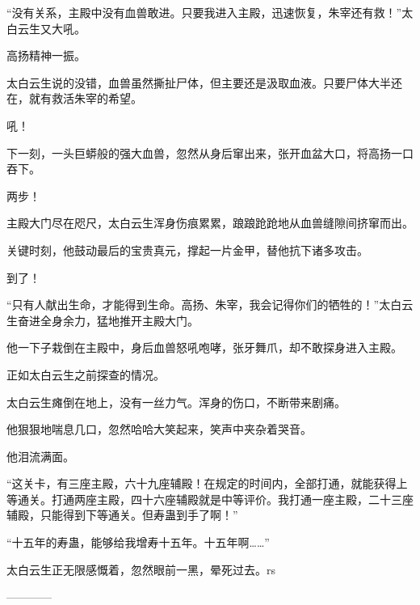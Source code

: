 \begin{this_body}
“没有关系，主殿中没有血兽敢进。只要我进入主殿，迅速恢复，朱宰还有救！”太白云生又大吼。

高扬精神一振。

太白云生说的没错，血兽虽然撕扯尸体，但主要还是汲取血液。只要尸体大半还在，就有救活朱宰的希望。

吼！

下一刻，一头巨蟒般的强大血兽，忽然从身后窜出来，张开血盆大口，将高扬一口吞下。

两步！

主殿大门尽在咫尺，太白云生浑身伤痕累累，踉踉跄跄地从血兽缝隙间挤窜而出。

关键时刻，他鼓动最后的宝贵真元，撑起一片金甲，替他抗下诸多攻击。

到了！

“只有人献出生命，才能得到生命。高扬、朱宰，我会记得你们的牺牲的！”太白云生奋进全身余力，猛地推开主殿大门。

他一下子栽倒在主殿中，身后血兽怒吼咆哮，张牙舞爪，却不敢探身进入主殿。

正如太白云生之前探查的情况。

太白云生瘫倒在地上，没有一丝力气。浑身的伤口，不断带来剧痛。

他狠狠地喘息几口，忽然哈哈大笑起来，笑声中夹杂着哭音。

他泪流满面。

“这关卡，有三座主殿，六十九座辅殿！在规定的时间内，全部打通，就能获得上等通关。打通两座主殿，四十六座辅殿就是中等评价。我打通一座主殿，二十三座辅殿，只能得到下等通关。但寿蛊到手了啊！”

“十五年的寿蛊，能够给我增寿十五年。十五年啊……”

太白云生正无限感慨着，忽然眼前一黑，晕死过去。rs

------------

\end{this_body}

